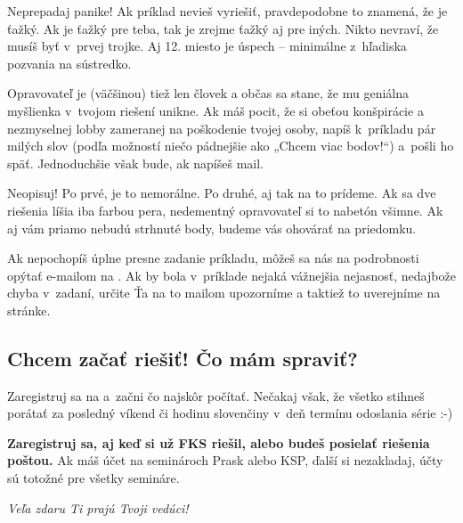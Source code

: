     Neprepadaj panike! Ak príklad nevieš vyriešiť, pravdepodobne to znamená, že je
    ťažký. Ak je ťažký pre teba, tak je zrejme ťažký aj pre iných. Nikto nevraví,
    že musíš byť v~prvej trojke. Aj 12. miesto je úspech -- minimálne z~hľadiska
    pozvania na sústredko.

    Opravovateľ je (väčšinou) tiež len človek a občas sa stane, že mu geniálna
    myšlienka v~tvojom riešení unikne. Ak máš pocit, že si obeťou konšpirácie a
    nezmyselnej lobby zameranej na poškodenie tvojej osoby, napíš k~príkladu pár
    milých slov (podľa možností niečo pádnejšie ako „Chcem viac bodov!“) a~pošli
    ho späť. Jednoduchšie však bude, ak napíšeš mail.

    Neopisuj! Po prvé, je to nemorálne. Po druhé, aj tak na to prídeme. Ak sa dve riešenia
    líšia iba farbou pera, nedementný opravovateľ si to nabetón všimne. Ak aj vám
    priamo nebudú strhnuté body, budeme vás ohovárať na priedomku.

    Ak nepochopíš úplne presne zadanie príkladu, môžeš sa nás na podrobnosti opýtať
    e-mailom na . Ak by bola v~príklade nejaká vážnejšia
    nejasnosť, nedajbože chyba v~zadaní, určite Ťa na to mailom upozorníme a taktiež to uverejníme na stránke.

\subsection{Chcem začať riešiť! Čo mám spraviť?}
    Zaregistruj sa na  a~začni čo najskôr počítať. Nečakaj však, že všetko stihneš porátať
    za posledný víkend či hodinu slovenčiny v~deň termínu odoslania série :-)

    \textbf{Zaregistruj sa, aj keď si už FKS riešil, alebo budeš posielať riešenia poštou.}
    Ak máš účet na seminároch Prask alebo KSP, ďalší si nezakladaj, účty sú totožné pre všetky semináre.

\hfill \emph{Veľa zdaru Ti prajú Tvoji vedúci!}%
